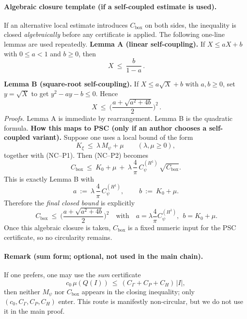 \documentclass[11pt]{article}
\theoremstyle{definition}
\theoremstyle{remark}
\begin{document}
\paragraph{Algebraic closure template (if a self-coupled estimate is used).}
If an alternative local estimate introduces $C_{\mathrm{box}}$ on both sides, the inequality is closed \emph{algebraically} before any certificate is applied. The following one-line lemmas are used repeatedly.
\medskip
\noindent\textbf{Lemma A (linear self-coupling).}
If $X\le aX+b$ with $0\le a<1$ and $b\ge0$, then
\[
\boxed{\,X\ \le\ \frac{b}{1-a}\,}.
\]

\noindent\textbf{Lemma B (square-root self-coupling).}
If $X\le a\sqrt{X}+b$ with $a,b\ge0$, set $y=\sqrt{X}$ to get
$y^2-ay-b\le0$. Hence
\[
\boxed{\,X\ \le\ \Big(\frac{a+\sqrt{a^2+4b}}{2}\Big)^{\!2}\,}.
\]
\noindent\emph{Proofs.} Lemma A is immediate by rearrangement. Lemma B is the quadratic formula.
\medskip
\noindent\textbf{How this maps to PSC (only if an author chooses a self-coupled variant).}
Suppose one uses a local bound of the form
\[
K_\xi\ \le\ \lambda\,M_\psi+\mu\qquad(\lambda,\mu\ge0),
\]
together with (NC--P1). Then (NC--P2) becomes
\[
C_{\mathrm{box}}\ \le\ K_0+\mu\ +\ \lambda\,\frac{4}{\pi}\,C_\psi^{(H^1)}\,\sqrt{C_{\mathrm{box}}}.
\]
This is exactly Lemma B with
\[
a\ :=\ \lambda\,\frac{4}{\pi}\,C_\psi^{(H^1)},\
\qquad
b\ :=\ K_0+\mu.
\]
Therefore the \emph{final closed bound} is explicitly
\[
\boxed{\,C_{\mathrm{box}}\ \le\ \Big(\frac{a+\sqrt{a^2+4b}}{2}\Big)^{\!2}}
\quad\text{with}\quad
a=\lambda\frac{4}{\pi}C_\psi^{(H^1)},\ \ b=K_0+\mu.
\]
Once this algebraic closure is taken, $C_{\mathrm{box}}$ is a fixed numeric input for the PSC certificate, so no circularity remains.

\paragraph{Remark (sum form; optional, not used in the main chain).}
If one prefers, one may use the \emph{sum} certificate
\[
c_0\,\mu(Q(I))\ \le\ (C_\Gamma+C_P+C_H)\,|I|,
\]
then neither $M_\psi$ nor $C_{\mathrm{box}}$ appears in the closing inequality; only $(c_0,C_\Gamma,C_P,C_H)$ enter. This route is manifestly non-circular, but we do not use it in the main proof.
\end{document}
